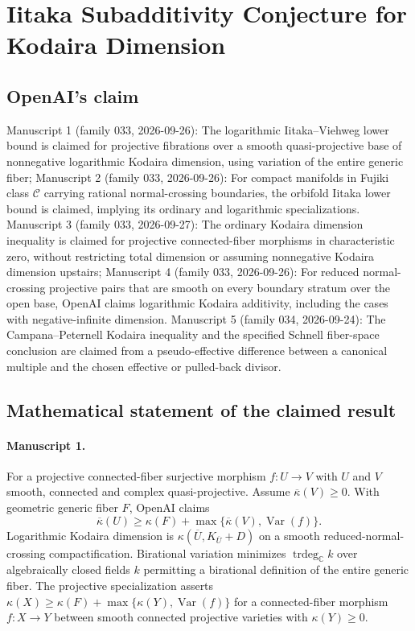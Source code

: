 \documentclass[11pt]{article}
\begin{document}
\section*{Iitaka Subadditivity Conjecture for Kodaira Dimension}

\subsection{OpenAI's claim}
Manuscript 1 (family 033, 2026-09-26): The logarithmic Iitaka--Viehweg lower bound is claimed for projective fibrations over a smooth quasi-projective base of nonnegative logarithmic Kodaira dimension, using variation of the entire generic fiber; Manuscript 2 (family 033, 2026-09-26): For compact manifolds in Fujiki class $\mathcal C$ carrying rational normal-crossing boundaries, the orbifold Iitaka lower bound is claimed, implying its ordinary and logarithmic specializations. Manuscript 3 (family 033, 2026-09-27): The ordinary Kodaira dimension inequality is claimed for projective connected-fiber morphisms in characteristic zero, without restricting total dimension or assuming nonnegative Kodaira dimension upstairs; Manuscript 4 (family 033, 2026-09-26): For reduced normal-crossing projective pairs that are smooth on every boundary stratum over the open base, OpenAI claims logarithmic Kodaira additivity, including the cases with negative-infinite dimension. Manuscript 5 (family 034, 2026-09-24): The Campana--Peternell Kodaira inequality and the specified Schnell fiber-space conclusion are claimed from a pseudo-effective difference between a canonical multiple and the chosen effective or pulled-back divisor.

\subsection{Mathematical statement of the claimed result}
\paragraph{Manuscript 1.}
For a projective connected-fiber surjective morphism $f:U\to V$ with $U$ and $V$ smooth, connected and complex quasi-projective. Assume $\overline\kappa(V)\ge0$. With geometric generic fiber $F$, OpenAI claims
\[
\overline\kappa(U)\ge\kappa(F)+\max\{\overline\kappa(V),\operatorname{Var}(f)\}.
\]
Logarithmic Kodaira dimension is $\kappa(\overline U,K_{\overline U}+D)$ on a smooth reduced-normal-crossing compactification. Birational variation minimizes $\operatorname{trdeg}_{\mathbb C}k$ over algebraically closed fields $k$ permitting a birational definition of the entire generic fiber. The projective specialization asserts $\kappa(X)\ge\kappa(F)+\max\{\kappa(Y),\operatorname{Var}(f)\}$ for a connected-fiber morphism $f:X\to Y$ between smooth connected projective varieties with $\kappa(Y)\ge0$.
\end{document}
